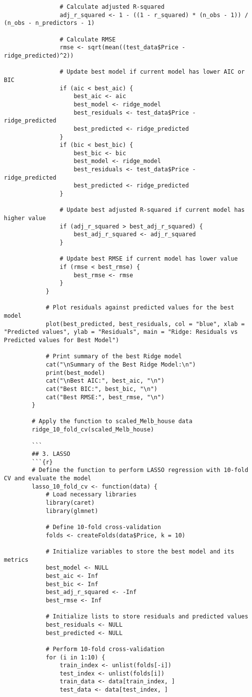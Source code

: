 \documentclass[12pt,doublespace]{article}
\begin{document}
\begin{lstlisting}
				# Calculate adjusted R-squared
				adj_r_squared <- 1 - ((1 - r_squared) * (n_obs - 1)) / (n_obs - n_predictors - 1)
				
				# Calculate RMSE
				rmse <- sqrt(mean((test_data$Price - ridge_predicted)^2))
				
				# Update best model if current model has lower AIC or BIC
				if (aic < best_aic) {
					best_aic <- aic
					best_model <- ridge_model
					best_residuals <- test_data$Price - ridge_predicted
					best_predicted <- ridge_predicted
				}
				if (bic < best_bic) {
					best_bic <- bic
					best_model <- ridge_model
					best_residuals <- test_data$Price - ridge_predicted
					best_predicted <- ridge_predicted
				}
				
				# Update best adjusted R-squared if current model has higher value
				if (adj_r_squared > best_adj_r_squared) {
					best_adj_r_squared <- adj_r_squared
				}
				
				# Update best RMSE if current model has lower value
				if (rmse < best_rmse) {
					best_rmse <- rmse
				}
			}
			
			# Plot residuals against predicted values for the best model
			plot(best_predicted, best_residuals, col = "blue", xlab = "Predicted values", ylab = "Residuals", main = "Ridge: Residuals vs Predicted values for Best Model")
			
			# Print summary of the best Ridge model
			cat("\nSummary of the Best Ridge Model:\n")
			print(best_model)
			cat("\nBest AIC:", best_aic, "\n")
			cat("Best BIC:", best_bic, "\n")
			cat("Best RMSE:", best_rmse, "\n")
		}
		
		# Apply the function to scaled_Melb_house data
		ridge_10_fold_cv(scaled_Melb_house)
		
		```
		## 3. LASSO
		```{r}
		# Define the function to perform LASSO regression with 10-fold CV and evaluate the model
		lasso_10_fold_cv <- function(data) {
			# Load necessary libraries
			library(caret)
			library(glmnet)
			
			# Define 10-fold cross-validation
			folds <- createFolds(data$Price, k = 10)
			
			# Initialize variables to store the best model and its metrics
			best_model <- NULL
			best_aic <- Inf
			best_bic <- Inf
			best_adj_r_squared <- -Inf
			best_rmse <- Inf
			
			# Initialize lists to store residuals and predicted values
			best_residuals <- NULL
			best_predicted <- NULL
			
			# Perform 10-fold cross-validation
			for (i in 1:10) {
				train_index <- unlist(folds[-i])
				test_index <- unlist(folds[i])
				train_data <- data[train_index, ]
				test_data <- data[test_index, ]
				

\end{lstlisting}
\end{document}
